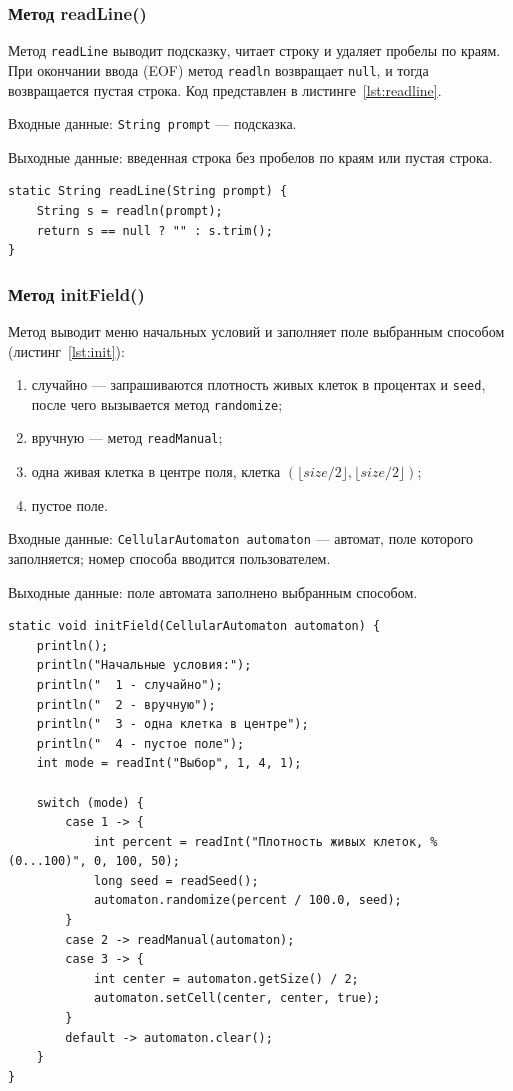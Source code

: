 \documentclass[a4paper,14pt]{extarticle}
\begin{document}
\subsubsection*{Метод readLine()}

Метод \texttt{readLine} выводит подсказку, читает строку и удаляет пробелы по краям. При окончании ввода (EOF) метод \texttt{readln} возвращает \texttt{null}, и тогда возвращается пустая строка. Код представлен в листинге~\ref{lst:readline}.

Входные данные: \texttt{String prompt} --- подсказка.

Выходные данные: введенная строка без пробелов по краям или пустая строка.

\begin{lstlisting}[caption={Метод readLine()}, label={lst:readline}]
static String readLine(String prompt) {
	String s = readln(prompt);
	return s == null ? "" : s.trim();
}
\end{lstlisting}

\subsubsection*{Метод initField()}

Метод выводит меню начальных условий и заполняет поле выбранным способом (листинг~\ref{lst:init}):
\begin{enumerate}
	\item случайно --- запрашиваются плотность живых клеток в процентах и \texttt{seed}, после чего вызывается метод \texttt{randomize};
	\item вручную --- метод \texttt{readManual};
	\item одна живая клетка в центре поля, клетка $(\lfloor size/2 \rfloor, \lfloor size/2 \rfloor)$;
	\item пустое поле.
\end{enumerate}

Входные данные: \texttt{CellularAutomaton automaton} --- автомат, поле которого заполняется; номер способа вводится пользователем.

Выходные данные: поле автомата заполнено выбранным способом.

\begin{lstlisting}[caption={Метод initField()}, label={lst:init}]
static void initField(CellularAutomaton automaton) {
	println();
	println("Начальные условия:");
	println("  1 - случайно");
	println("  2 - вручную");
	println("  3 - одна клетка в центре");
	println("  4 - пустое поле");
	int mode = readInt("Выбор", 1, 4, 1);

	switch (mode) {
		case 1 -> {
			int percent = readInt("Плотность живых клеток, % (0...100)", 0, 100, 50);
			long seed = readSeed();
			automaton.randomize(percent / 100.0, seed);
		}
		case 2 -> readManual(automaton);
		case 3 -> {
			int center = automaton.getSize() / 2;
			automaton.setCell(center, center, true);
		}
		default -> automaton.clear();
	}
}
\end{lstlisting}
\end{document}
